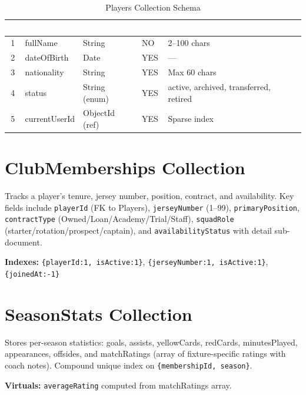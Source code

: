 \documentclass[12pt,a4paper,oneside]{report}
\begin{document}
\begin{table}[H]
\centering
\caption{Players Collection Schema}
\label{tab:players}
\small
\begin{tabularx}{\textwidth}{|c|l|l|l|X|}
\hline
\rowcolor{tableHeader}
\textcolor{white}{\#} & \textcolor{white}{\textbf{Field}} & \textcolor{white}{\textbf{Type}} & \textcolor{white}{\textbf{Null}} & \textcolor{white}{\textbf{Constraints}} \\
\hline
1 & fullName       & String            & NO  & 2--100 chars \\
\hline\rowcolor{tableRow}
2 & dateOfBirth    & Date              & YES & --- \\
\hline
3 & nationality    & String            & YES & Max 60 chars \\
\hline\rowcolor{tableRow}
4 & status         & String (enum)     & YES & active, archived, transferred, retired \\
\hline
5 & currentUserId  & ObjectId (ref)    & YES & Sparse index \\
\hline
\end{tabularx}
\end{table}

\section{ClubMemberships Collection}

Tracks a player's tenure, jersey number, position, contract, and availability. Key fields include \texttt{playerId} (FK to Players), \texttt{jerseyNumber} (1--99), \texttt{primaryPosition}, \texttt{contractType} (Owned/Loan/Academy/Trial/Staff), \texttt{squadRole} (starter/rotation/prospect/captain), and \texttt{availabilityStatus} with detail sub-document.

\noindent\textbf{Indexes:} \texttt{\{playerId:1, isActive:1\}}, \texttt{\{jerseyNumber:1, isActive:1\}}, \texttt{\{joinedAt:-1\}}

\section{SeasonStats Collection}

Stores per-season statistics: goals, assists, yellowCards, redCards, minutesPlayed, appearances, offsides, and matchRatings (array of fixture-specific ratings with coach notes). Compound unique index on \texttt{\{membershipId, season\}}.

\noindent\textbf{Virtuals:} \texttt{averageRating} computed from matchRatings array.
\end{document}
